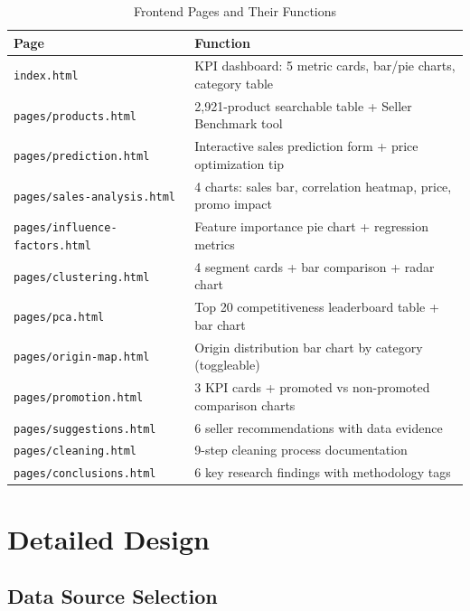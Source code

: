 \documentclass[12pt,a4paper]{report}
\begin{document}
\begin{table}[H]
  \centering
  \caption{Frontend Pages and Their Functions}
  \begin{tabular}{@{}ll@{}}
    \toprule
    \textbf{Page} & \textbf{Function} \\
    \midrule
    \texttt{index.html}              & KPI dashboard: 5 metric cards, bar/pie charts, category table \\
    \texttt{pages/products.html}     & 2,921-product searchable table + Seller Benchmark tool \\
    \texttt{pages/prediction.html}   & Interactive sales prediction form + price optimization tip \\
    \texttt{pages/sales-analysis.html} & 4 charts: sales bar, correlation heatmap, price, promo impact \\
    \texttt{pages/influence-factors.html} & Feature importance pie chart + regression metrics \\
    \texttt{pages/clustering.html}   & 4 segment cards + bar comparison + radar chart \\
    \texttt{pages/pca.html}          & Top 20 competitiveness leaderboard table + bar chart \\
    \texttt{pages/origin-map.html}   & Origin distribution bar chart by category (toggleable) \\
    \texttt{pages/promotion.html}    & 3 KPI cards + promoted vs non-promoted comparison charts \\
    \texttt{pages/suggestions.html}  & 6 seller recommendations with data evidence \\
    \texttt{pages/cleaning.html}     & 9-step cleaning process documentation \\
    \texttt{pages/conclusions.html}  & 6 key research findings with methodology tags \\
    \bottomrule
  \end{tabular}
\end{table}

\newpage

\chapter{Detailed Design}

\section{Data Source Selection}
\end{document}
